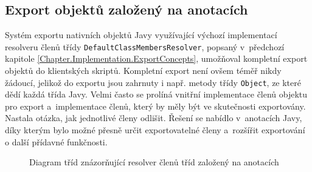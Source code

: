 \subsection{Export objektů založený na anotacích}
\label{Chapter.Implementation.AnnotationExportConcepts}

Systém exportu nativních objektů Javy využívající výchozí implementací resolveru členů třídy \texttt{DefaultClassMembersResolver}, popsaný v~předchozí kapitole \ref{Chapter.Implementation.ExportConcepts}, umožňoval kompletní export objektů do klientských skriptů. Kompletní export není ovšem téměř nikdy žádoucí, jelikož do exportu jsou zahrnuty i např. metody třídy \texttt{Object}, ze které dědí každá třída Javy. Velmi často se prolíná vnitřní implementace členů objektu pro export a~implementace členů, který by měly být ve skutečnosti exportovány. Nastala otázka, jak jednotlivé členy odlišit. Řešení se nabídlo v~anotacích Javy, díky kterým bylo možné přesně určit exportovatelné členy a~rozšířit exportování o další přídavné funkčnosti.

\begin{figure}[H]
  \begin{center}
    \caption{Diagram tříd znázorňující resolver členů tříd založený na anotacích}
    \label{Figure.AnnotationClassMembersResolver}
  \end{center}
\end{figure}

